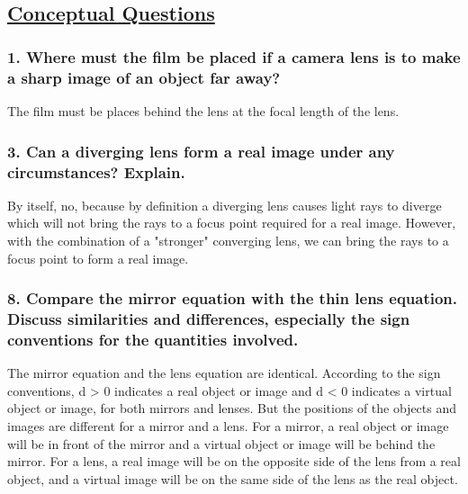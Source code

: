 \documentclass{article}
\title{
    \vspace{2in}
    \textmd{\textbf{\hmwkTitle}}\\
    \vspace{0.5in}
    \textmd{\textbf{\hmwkClass}}\\
    \vspace{4in}
}
\author{\hmwkAuthorName}
\date{}
\begin{document}
\maketitle
\newpage
\begin{center}
    \section*{\textbf{\underline {Conceptual Questions}}}
\end{center}
\subsubsection*{
    1. Where must the film be placed if a camera lens is to make a sharp image
    of an object far away?
}
The film must be places behind the lens at the focal length of the lens.
\subsubsection*{
    3.  Can a diverging lens form a real image under any circumstances? Explain. 
}
By itself, no, because by definition a diverging lens causes light rays to
diverge which will not bring the rays to a focus point required for a real image.
However, with the combination of a "stronger" converging lens, we can bring the
rays to a focus point to form a real image.
\subsubsection*{
    8. Compare the mirror equation with the thin lens equation. Discuss similarities
    and differences, especially the sign conventions for the quantities involved.
}
The mirror equation and the lens equation are identical. According to the sign conventions, d > 0
indicates a real object or image and d < 0 indicates a virtual object or image, for both mirrors and
lenses. But the positions of the objects and images are different for a mirror and a lens. For a mirror,
a real object or image will be in front of the mirror and a virtual object or image will be behind the
mirror. For a lens, a real image will be on the opposite side of the lens from a real object, and a
virtual image will be on the same side of the lens as the real object.
\end{document}
